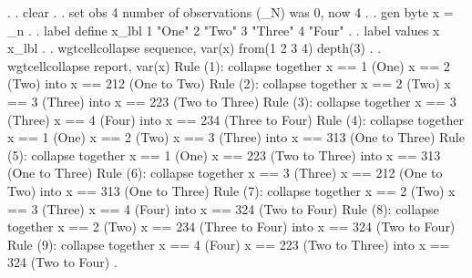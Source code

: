 {\smallskip}
. 
. clear
{\smallskip}
. 
. set obs 4
number of observations (_N) was 0, now 4
{\smallskip}
. 
. gen byte x = _n
{\smallskip}
. 
. label define x_lbl 1 "One" 2 "Two" 3 "Three" 4 "Four"
{\smallskip}
. 
. label values x x_lbl
{\smallskip}
. 
. wgtcellcollapse sequence, var(x) from(1 2 3 4) depth(3)
{\smallskip}
. 
. wgtcellcollapse report, var(x)
{\smallskip}
Rule (1): collapse together
  x == 1 (One)
  x == 2 (Two)
  into x == 212 (One to Two)
{\smallskip}
Rule (2): collapse together
  x == 2 (Two)
  x == 3 (Three)
  into x == 223 (Two to Three)
{\smallskip}
Rule (3): collapse together
  x == 3 (Three)
  x == 4 (Four)
  into x == 234 (Three to Four)
{\smallskip}
Rule (4): collapse together
  x == 1 (One)
  x == 2 (Two)
  x == 3 (Three)
  into x == 313 (One to Three)
{\smallskip}
Rule (5): collapse together
  x == 1 (One)
  x == 223 (Two to Three)
  into x == 313 (One to Three)
{\smallskip}
Rule (6): collapse together
  x == 3 (Three)
  x == 212 (One to Two)
  into x == 313 (One to Three)
{\smallskip}
Rule (7): collapse together
  x == 2 (Two)
  x == 3 (Three)
  x == 4 (Four)
  into x == 324 (Two to Four)
{\smallskip}
Rule (8): collapse together
  x == 2 (Two)
  x == 234 (Three to Four)
  into x == 324 (Two to Four)
{\smallskip}
Rule (9): collapse together
  x == 4 (Four)
  x == 223 (Two to Three)
  into x == 324 (Two to Four)
{\smallskip}
{\smallskip}
. 
